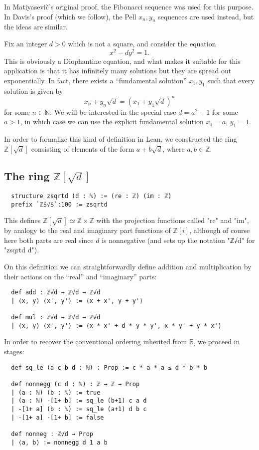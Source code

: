 \documentclass{llncs}
\newcommand{\N}{\mathbb{N}}
\newcommand{\Z}{\mathbb{Z}}
\begin{document}
In Matiyasevi\v{c}'s original proof, the Fibonacci sequence was used for this purpose. In Davis's proof (which we follow), the Pell $x_n,y_n$ sequences are used instead, but the ideas are similar.

Fix an integer $d>0$ which is not a square, and consider the equation
$$x^2-dy^2=1.$$
This is obviously a Diophantine equation, and what makes it suitable for this application is that it has infinitely many solutions but they are spread out exponentially. In fact, there exists a ``fundamental solution'' $x_1,y_1$ such that every solution is given by
$$x_n+y_n\sqrt d=(x_1+y_1\sqrt d)^n$$
for some $n\in\N$. We will be interested in the special case $d=a^2-1$ for some $a>1$, in which case we can use the explicit fundamental solution $x_1=a$, $y_1=1$.

In order to formalize this kind of definition in Lean, we constructed the ring $\Z[\sqrt d]$ consisting of elements of the form $a+b\sqrt d$, where $a,b\in\Z$.

\subsection{The ring $\Z[\sqrt d]$}

\begin{lstlisting}
  structure zsqrtd (d : ℕ) := (re : ℤ) (im : ℤ)
  prefix `ℤ$√$`:100 := zsqrtd
\end{lstlisting}

This defines $\Z[\sqrt d]\simeq\Z\times\Z$ with the projection functions called "re" and "im", by analogy to the real and imaginary part functions of $\Z[i]$, although of course here both parts are real since $d$ is nonnegative (and sets up the notation "ℤ√d" for "zsqrtd d").

On this definition we can straightforwardly define addition and multiplication by their actions on the ``real'' and ``imaginary'' parts:

\begin{lstlisting}
  def add : ℤ√d → ℤ√d → ℤ√d
  | ⟨x, y⟩ ⟨x', y'⟩ := ⟨x + x', y + y'⟩

  def mul : ℤ√d → ℤ√d → ℤ√d
  | ⟨x, y⟩ ⟨x', y'⟩ := ⟨x * x' + d * y * y', x * y' + y * x'⟩
\end{lstlisting}

In order to recover the conventional ordering inherited from $\mathbb{R}$, we proceed in stages:

\begin{lstlisting}
  def sq_le (a c b d : ℕ) : Prop := c * a * a ≤ d * b * b

  def nonnegg (c d : ℕ) : ℤ → ℤ → Prop
  | (a : ℕ) (b : ℕ) := true
  | (a : ℕ) -[1+ b] := sq_le (b+1) c a d
  | -[1+ a] (b : ℕ) := sq_le (a+1) d b c
  | -[1+ a] -[1+ b] := false

  def nonneg : ℤ√d → Prop
  | ⟨a, b⟩ := nonnegg d 1 a b
\end{lstlisting}
\end{document}

